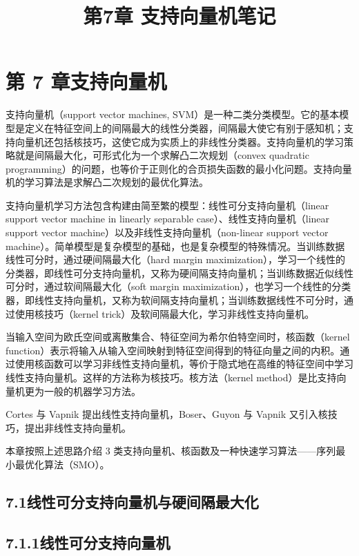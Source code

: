 \documentclass[UTF8,12pt,a4paper,fontset=fandol]{ctexart}
\title{第7章 支持向量机笔记}
\author{}
\date{}
\begin{document}
\maketitle

\section*{第 7 章\quad 支持向量机}

支持向量机（support vector machines, SVM）是一种二类分类模型。它的基本模型是定义在特征空间上的间隔最大的线性分类器，间隔最大使它有别于感知机；支持向量机还包括核技巧，这使它成为实质上的非线性分类器。支持向量机的学习策略就是间隔最大化，可形式化为一个求解凸二次规划（convex quadratic programming）的问题，也等价于正则化的合页损失函数的最小化问题。支持向量机的学习算法是求解凸二次规划的最优化算法。

支持向量机学习方法包含构建由简至繁的模型：线性可分支持向量机（linear support vector machine in linearly separable case）、线性支持向量机（linear support vector machine）以及非线性支持向量机（non-linear support vector machine）。简单模型是复杂模型的基础，也是复杂模型的特殊情况。当训练数据线性可分时，通过硬间隔最大化（hard margin maximization），学习一个线性的分类器，即线性可分支持向量机，又称为硬间隔支持向量机；当训练数据近似线性可分时，通过软间隔最大化（soft margin maximization），也学习一个线性的分类器，即线性支持向量机，又称为软间隔支持向量机；当训练数据线性不可分时，通过使用核技巧（kernel trick）及软间隔最大化，学习非线性支持向量机。

当输入空间为欧氏空间或离散集合、特征空间为希尔伯特空间时，核函数（kernel function）表示将输入从输入空间映射到特征空间得到的特征向量之间的内积。通过使用核函数可以学习非线性支持向量机，等价于隐式地在高维的特征空间中学习线性支持向量机。这样的方法称为核技巧。核方法（kernel method）是比支持向量机更为一般的机器学习方法。

Cortes 与 Vapnik 提出线性支持向量机，Boser、Guyon 与 Vapnik 又引入核技巧，提出非线性支持向量机。

本章按照上述思路介绍 3 类支持向量机、核函数及一种快速学习算法——序列最小最优化算法（SMO）。

\subsection*{7.1\quad 线性可分支持向量机与硬间隔最大化}

\subsection*{7.1.1\quad 线性可分支持向量机}
\end{document}
